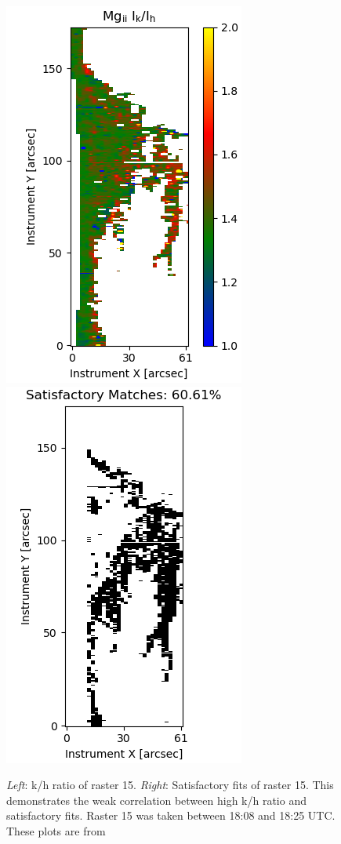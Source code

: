 \begin{figure}
    \centering
    \includegraphics[width=0.3\linewidth]{./02Modelling1D/figs/20180419/kh14.png}
    \includegraphics[width=0.3\linewidth]{./02Modelling1D/figs/20180419/goodbad14.png}
    \caption[k/h ratio and satisfactory fits of raster 15. This demonstrates the weak correlation between high k/h ratio and satisfactory fits.]{\textit{Left}: k/h ratio of raster 15. \textit{Right}: Satisfactory fits of raster 15. This demonstrates the weak correlation between high k/h ratio and satisfactory fits. Raster 15 was taken between 18:08 and 18:25 UTC. These plots are from \cite{peat_solar_2021}}
    \label{khandgoods}
\end{figure}

